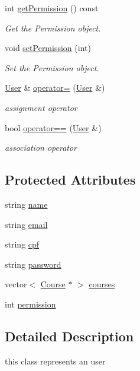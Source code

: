 \begin{DoxyCompactItemize}
int \hyperlink{classUserImpl_ac2233b5f85222b2db6a1877083374973}{get\+Permission} () const
\begin{DoxyCompactList}\small\item\em Get the Permission object. \end{DoxyCompactList}\item 
void \hyperlink{classUserImpl_ac273d611344f59bf69e6eabb412e84ee}{set\+Permission} (int)
\begin{DoxyCompactList}\small\item\em Set the Permission object. \end{DoxyCompactList}\item 
\hyperlink{classUser}{User} \& \hyperlink{classUserImpl_aa89ed62b1dbd34811cf7e32137009b6d}{operator=} (\hyperlink{classUser}{User} \&)
\begin{DoxyCompactList}\small\item\em assignment operator \end{DoxyCompactList}\item 
bool \hyperlink{classUserImpl_a1b79e70d839345e3ea0b05637183c1e1}{operator==} (\hyperlink{classUser}{User} \&)
\begin{DoxyCompactList}\small\item\em association operator \end{DoxyCompactList}\end{DoxyCompactItemize}
\subsection*{Protected Attributes}
\begin{DoxyCompactItemize}
\item 
string \hyperlink{classUserImpl_abdfed2d2311d220d014cc1a9e620a3cd}{name}
\item 
string \hyperlink{classUserImpl_ad22267401b7861aab1a9ae11968adada}{email}
\item 
string \hyperlink{classUserImpl_a02392facb44ec294182bd5db2008ca19}{cpf}
\item 
string \hyperlink{classUserImpl_a43fad715265a41dfd46beebe6df25f9c}{password}
\item 
vector$<$ \hyperlink{classCourse}{Course} $\ast$ $>$ \hyperlink{classUserImpl_a26aab39f0c044fce5ac016bfdbaa0ae6}{courses}
\item 
int \hyperlink{classUserImpl_aa5291056890b6c1a6c92df0c168b219d}{permission}
\end{DoxyCompactItemize}


\subsection{Detailed Description}
this class represents an user 

